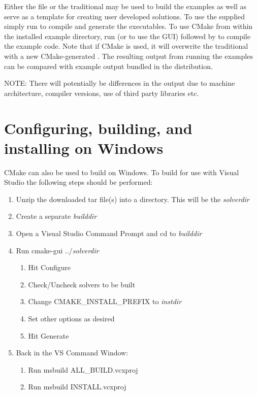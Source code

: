 Either the  file or the traditional  may be used
to build the examples as well as serve as a template for creating user developed
solutions.  To use the supplied  simply run  to compile
and generate the executables.  To use CMake from within the installed example
directory, run  (or  to use the GUI) followed by 
to compile the example code.  Note that if CMake is used, it will overwrite the
traditional  with a new CMake-generated .  The
resulting output from running the examples can be compared with example output
bundled in the {\sundials} distribution.

\noindent NOTE: There will potentially be differences in the output due to
machine architecture, compiler versions, use of third party libraries
etc.{\warn}


\section{Configuring, building, and installing  on Windows}\label{s:cmake_windows}
CMake can also be used to build {\sundials} on Windows. To build {\sundials} for
use with Visual Studio the following steps should be performed:
\begin{enumerate}
\item Unzip the downloaded tar file(s) into a directory. This will be the {\em solverdir}
\item Create a separate {\em builddir}
\item Open a Visual Studio Command Prompt and cd to {\em builddir}
\item Run cmake-gui ../{\em solverdir}
\begin{enumerate}
\item Hit Configure
\item Check/Uncheck solvers to be built
\item Change CMAKE\_INSTALL\_PREFIX to {\em instdir}
\item Set other options as desired
\item Hit Generate
\end{enumerate}
\item Back in the VS Command Window:
\begin{enumerate}
\item Run msbuild ALL\_BUILD.vcxproj
\item Run msbuild INSTALL.vcxproj
\end{enumerate}
\end{enumerate}

